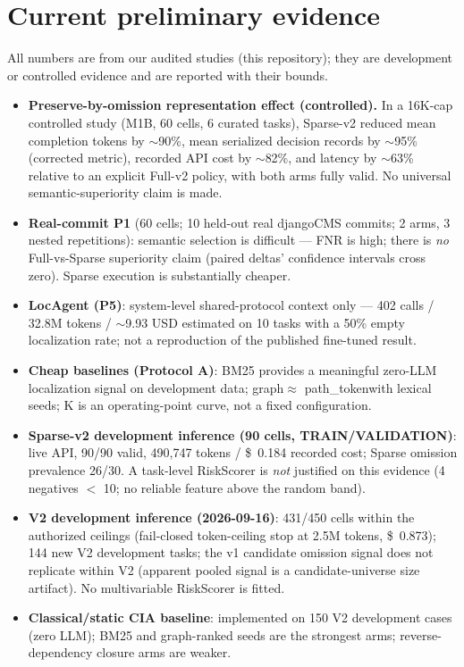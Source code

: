 \documentclass[11pt,a4paper]{article}
\begin{document}
\section{Current preliminary evidence}
\label{sec:evidence}

All numbers are from our audited studies (this repository); they are
development or controlled evidence and are reported with their bounds.

\begin{itemize}
  \item \textbf{Preserve-by-omission representation effect (controlled).}
  In a 16K-cap controlled study (M1B, 60 cells, 6 curated tasks), Sparse-v2
  reduced mean completion tokens by $\sim$90\%, mean serialized decision
  records by $\sim$95\% (corrected metric), recorded API cost by $\sim$82\%,
  and latency by $\sim$63\% relative to an explicit Full-v2 policy, with both
  arms fully valid. No universal semantic-superiority claim is made.
  \item \textbf{Real-commit P1} (60 cells; 10 held-out real djangoCMS commits;
  2 arms, 3 nested repetitions): semantic selection is difficult --- FNR is
  high; there is \emph{no} Full-vs-Sparse superiority claim (paired deltas'
  confidence intervals cross zero). Sparse execution is substantially cheaper.
  \item \textbf{LocAgent (P5)}: system-level shared-protocol context only ---
  402 calls / 32.8M tokens / $\sim$9.93 USD estimated on 10 tasks with a 50\%
  empty localization rate; not a reproduction of the published fine-tuned
  result.
  \item \textbf{Cheap baselines (Protocol A)}: BM25 provides a meaningful
  zero-LLM localization signal on development data; graph\@K $\approx$
  path\_token\@K with lexical seeds; K is an operating-point curve, not a
  fixed configuration.
  \item \textbf{Sparse-v2 development inference (90 cells, TRAIN/VALIDATION)}:
  live API, 90/90 valid, 490,747 tokens / \$\ 0.184 recorded cost; Sparse
  omission prevalence 26/30. A task-level RiskScorer is \emph{not} justified on
  this evidence (4 negatives $<$ 10; no reliable feature above the random
  band).
  \item \textbf{V2 development inference (2026-09-16)}: 431/450 cells within
  the authorized ceilings (fail-closed token-ceiling stop at 2.5M tokens,
  \$\ 0.873); 144 new V2 development tasks; the v1 candidate omission signal
  does not replicate within V2 (apparent pooled signal is a candidate-universe
  size artifact). No multivariable RiskScorer is fitted.
  \item \textbf{Classical/static CIA baseline}: implemented on 150 V2
  development cases (zero LLM); BM25 and graph-ranked seeds are the strongest
  arms; reverse-dependency closure arms are weaker.
\end{itemize}
\end{document}

